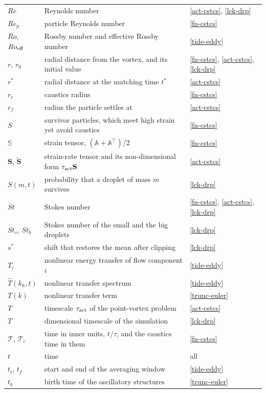 \begin{longtable}{@{}p{}p{}p{}@{}}
$Re$ & Reynolds number & \ref{act-cstcs}, \ref{lck-drp} \\
$Re_p$ & particle Reynolds number & \ref{fn-cstcs} \\
$Ro$, $Ro_{\rm eff}$ & Rossby number and effective Rossby number & \ref{tide-eddy} \\
$r$, $r_0$ & radial distance from the vortex, and its initial value & \ref{fn-cstcs}, \ref{act-cstcs}, \ref{lck-drp} \\
$r^*$ & radial distance at the matching time $t^*$ & \ref{act-cstcs} \\
$r_c$ & caustics radius & \ref{fn-cstcs} \\
$r_f$ & radius the particle settles at & \ref{act-cstcs} \\
\addlinespace
$S$ & survivor particles, which meet high strain yet avoid caustics & \ref{fn-cstcs} \\
$\mathbb{S}$ & strain tensor, $(\mathbb{A}+\mathbb{A}^{\!\top})/2$ & \ref{fn-cstcs} \\
$\mathbf{S}$, $\tilde{\mathbf{S}}$ & strain-rate tensor and its non-dimensional form $\tau_{\rm act}\mathbf{S}$ & \ref{act-cstcs} \\
$S(m,t)$ & probability that a droplet of mass $m$ survives & \ref{lck-drp} \\
$St$ & Stokes number & \ref{fn-cstcs}, \ref{act-cstcs}, \ref{lck-drp} \\
$St_s$, $St_b$ & Stokes number of the small and the big droplets & \ref{lck-drp} \\
$s^*$ & shift that restores the mean after clipping & \ref{lck-drp} \\
\addlinespace
$T_i$ & nonlinear energy transfer of flow component $i$ & \ref{tide-eddy} \\
$\widehat{T}(k_h,t)$ & nonlinear transfer spectrum & \ref{tide-eddy} \\
$T(k)$ & nonlinear transfer term & \ref{trunc-euler} \\
$T$ & timescale $\tau_{\rm act}$ of the point-vortex problem & \ref{act-cstcs} \\
$T$ & dimensional timescale of the simulation & \ref{lck-drp} \\
$\mathcal{T}$, $\mathcal{T}_c$ & time in inner units, $t/\tau$, and the caustics time in them & \ref{fn-cstcs} \\
$t$ & time & all \\
$t_i$, $t_f$ & start and end of the averaging window & \ref{tide-eddy} \\
$t_b$ & birth time of the oscillatory structures & \ref{trunc-euler} \\

\end{longtable}
